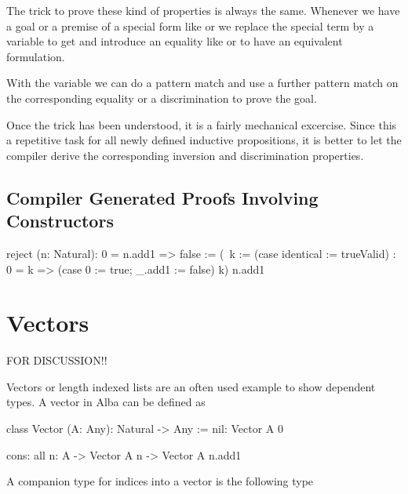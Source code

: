 The trick to prove these kind of properties is always the same. Whenever we have
a goal or a premise of a special form like  or
 we replace the special term by a variable to get
 and introduce an equality like  or  to have an equivalent formulation.

With the variable we can do a pattern match and use a further pattern match on
the corresponding equality or a discrimination to prove the goal.

Once the trick has been understood, it is a fairly mechanical excercise. Since
this a repetitive task for all newly defined inductive propositions, it is
better to let the compiler derive the corresponding inversion and discrimination
properties.



\subsection{Compiler Generated Proofs Involving Constructors}



\begin{alba}
    reject (n: Natural): 0 = n.add1 => false
    :=
        (\ k :=
            (case identical := trueValid)
            : 0 = k
              =>
              (case 0 := true; _.add1 := false) k)
          n.add1
\end{alba}


\begin{alba}
\end{alba}





\section{Vectors}


FOR DISCUSSION!!


Vectors or length indexed lists are an often used example to show dependent
types. A vector in Alba can be defined as

\begin{alba}
    class
        Vector (A: Any): Natural -> Any
    :=
        nil: Vector A 0

        cons: all {n}: A -> Vector A n -> Vector A n.add1
\end{alba}

A companion type for indices into a vector is the following type

